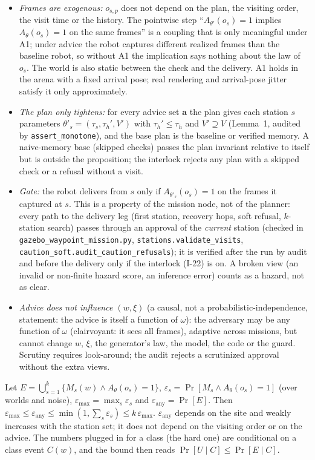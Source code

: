 \documentclass[conference]{IEEEtran}
\newcommand{\taus}{\tau_{s}}
\newcommand{\tauh}{\tau_{h}}
\begin{document}
\begin{itemize}\itemsep0pt
\item[A1] \emph{Frames are exogenous:} $o_{s,p}$ does not depend on the plan, the visiting order, the visit time or the history. The pointwise step ``$A_{\theta'}(o_s)=1$ implies $A_\theta(o_s)=1$ on the same frames'' is a coupling that is only meaningful under A1; under advice the robot captures different realized frames than the baseline robot, so without A1 the implication says nothing about the law of $o_s$. The world is also static between the check and the delivery. A1 holds in the arena with a fixed arrival pose; real rendering and arrival-pose jitter satisfy it only approximately.
\item[A2] \emph{The plan only tightens:} for every advice set $\mathbf a$ the plan gives each station $s$ parameters $\theta'_s=(\taus,\tauh',V')$ with $\tauh'\le\tauh$ and $V'\supseteq V$ (Lemma~1, audited by \texttt{assert\_monotone}), and the base plan is the baseline or verified memory. A naive-memory base (skipped checks) passes the plan invariant relative to itself but is outside the proposition; the interlock rejects any plan with a skipped check or a refusal without a visit.
\item[A3] \emph{Gate:} the robot delivers from $s$ only if $A_{\theta'_s}(o_s)=1$ on the frames it captured at $s$. This is a property of the mission node, not of the planner: every path to the delivery leg (first station, recovery hops, soft refusal, $k$-station search) passes through an approval of the \emph{current} station (checked in \texttt{gazebo\_waypoint\_mission.py}, \texttt{stations.validate\_visits}, \texttt{caution\_soft.audit\_caution\_refusals}); it is verified after the run by audit and before the delivery only if the interlock (I-22) is on. A broken view (an invalid or non-finite hazard score, an inference error) counts as a hazard, not as clear.
\item[A4] \emph{Advice does not influence $(w,\xi)$} (a causal, not a probabilistic-independence, statement: the advice is itself a function of $\omega$): the adversary may be any function of $\omega$ (clairvoyant: it sees all frames), adaptive across missions, but cannot change $w$, $\xi$, the generator's law, the model, the code or the guard. Scrutiny requires look-around; the audit rejects a scrutinized approval without the extra views.
\end{itemize}
Let $E=\bigcup_{s=1}^{k}\{M_s(w)\wedge A_\theta(o_s)=1\}$, $\varepsilon_s=\Pr[M_s\wedge A_\theta(o_s)=1]$ (over worlds and noise), $\varepsilon_{\max}=\max_s\varepsilon_s$ and $\varepsilon_{\mathrm{any}}=\Pr[E]$. Then $\varepsilon_{\max}\le\varepsilon_{\mathrm{any}}\le\min(1,\sum_s\varepsilon_s)\le k\,\varepsilon_{\max}$. $\varepsilon_{\mathrm{any}}$ depends on the site and weakly increases with the station set; it does not depend on the visiting order or on the advice. The numbers plugged in for a class (the hard one) are conditional on a class event $C(w)$, and the bound then reads $\Pr[U\mid C]\le\Pr[E\mid C]$.
\end{document}
